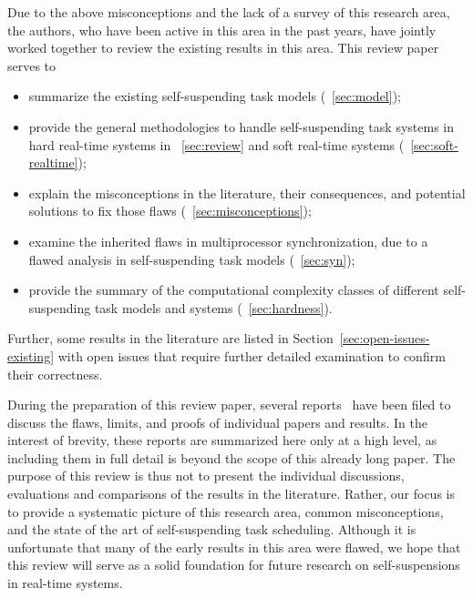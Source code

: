 \noindent Due to the above misconceptions and the lack of a survey of this research area, the authors, who have been active in this area in the past years, have jointly worked together to review the existing results in this area. This review paper serves to
\begin{itemize}
\item summarize the existing self-suspending task models (\mysectionref{}~\ref{sec:model}); 
\item provide the general methodologies to handle self-suspending task systems in hard real-time systems in \mysectionref{}~\ref{sec:review} and soft real-time systems (\mysectionref{}~\ref{sec:soft-realtime});
\item explain the misconceptions in the literature, their consequences, and potential solutions to fix those flaws (\mysectionref{}~\ref{sec:misconceptions}); 
\item examine the inherited flaws in multiprocessor synchronization, due to a flawed analysis in self-suspending task models (\mysectionref{}~\ref{sec:syn});
\item provide the summary of the computational complexity classes of different self-suspending task models and systems (\mysectionref{}~\ref{sec:hardness}).
\end{itemize}
Further, some results in the literature are listed in Section~\ref{sec:open-issues-existing} with open issues that require further detailed examination to confirm their correctness. 

During the preparation of this review paper, several reports~ \cite{ChenHuangNelissen,ChenBrandenburg,erratu-cong-anderson,BletsasReport2015}  have been filed to discuss the flaws, limits, and proofs of individual papers and results. In the interest of brevity, these reports are summarized here only at a high level, as including them in full detail is beyond the scope of this already long paper.
The purpose of this review is thus not to present the individual discussions, evaluations and comparisons of the results in the literature. Rather, our focus is to provide a systematic picture of this research area, common misconceptions, and the state of the art of self-suspending task scheduling. Although it is unfortunate that many of the early results in this area were flawed, we hope that this review will serve as a solid foundation for future research on self-suspensions in real-time systems.









    
  

    
  
